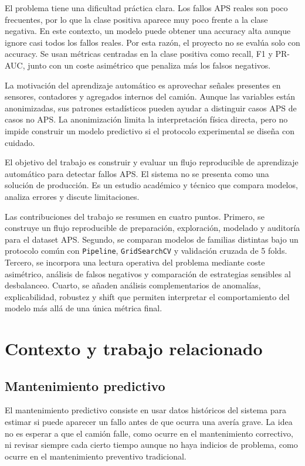 \documentclass[11pt,a4paper]{article}
\begin{document}
El problema tiene una dificultad práctica clara. Los fallos APS reales son poco frecuentes, por lo que la clase positiva aparece muy poco frente a la clase negativa. En este contexto, un modelo puede obtener una accuracy alta aunque ignore casi todos los fallos reales. Por esta razón, el proyecto no se evalúa solo con accuracy. Se usan métricas centradas en la clase positiva como recall, F1 y PR-AUC, junto con un coste asimétrico que penaliza más los falsos negativos.

La motivación del aprendizaje automático es aprovechar señales presentes en sensores, contadores y agregados internos del camión. Aunque las variables están anonimizadas, sus patrones estadísticos pueden ayudar a distinguir casos APS de casos no APS. La anonimización limita la interpretación física directa, pero no impide construir un modelo predictivo si el protocolo experimental se diseña con cuidado.

El objetivo del trabajo es construir y evaluar un flujo reproducible de aprendizaje automático para detectar fallos APS. El sistema no se presenta como una solución de producción. Es un estudio académico y técnico que compara modelos, analiza errores y discute limitaciones.

Las contribuciones del trabajo se resumen en cuatro puntos. Primero, se construye un flujo reproducible de preparación, exploración, modelado y auditoría para el dataset APS. Segundo, se comparan modelos de familias distintas bajo un protocolo común con \texttt{Pipeline}, \texttt{GridSearchCV} y validación cruzada de 5 folds. Tercero, se incorpora una lectura operativa del problema mediante coste asimétrico, análisis de falsos negativos y comparación de estrategias sensibles al desbalanceo. Cuarto, se añaden análisis complementarios de anomalías, explicabilidad, robustez y shift que permiten interpretar el comportamiento del modelo más allá de una única métrica final.


\section{Contexto y trabajo relacionado}
\label{sec_contexto}

\subsection{Mantenimiento predictivo}

El mantenimiento predictivo consiste en usar datos históricos del sistema para estimar si puede aparecer un fallo antes de que ocurra una avería grave. La idea no es esperar a que el camión falle, como ocurre en el mantenimiento correctivo, ni revisar siempre cada cierto tiempo aunque no haya indicios de problema, como ocurre en el mantenimiento preventivo tradicional.
\end{document}

